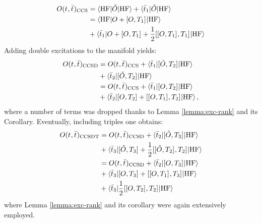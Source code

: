 \begin{equation}\label{eq:ccs-expectation-value}
\begin{aligned}
  O(t_{}, \bar{t}_{})_\mathrm{CCS} &=
  \braket{\mathrm{HF} | \check{O} | \mathrm{HF} }
  + \braket{\bar{t}_{1} | \check{O} | \mathrm{HF} } \\
  &=
  \braket{\mathrm{HF} | O + [ O, T_1 ]^{} | \mathrm{HF} } \\
  &+ \braket{\bar{t}_{1} | O + [ O, T_1 ]^{}
  + \frac{1}{2}[ [ O, T_1 ]^{}, T_1 ]^{} | \mathrm{HF} }
\end{aligned}
\end{equation}
Adding double excitations to the manifold yields:
\begin{equation}\label{eq:ccsd-expectation-value}
  \begin{aligned}
  O(t_{}, \bar{t}_{})_\mathrm{CCSD}
  &=
    O(t_{}, \bar{t}_{})_\mathrm{CCS}
  + \braket{\bar{t}_{1} | [ \check{O}, T_2 ]^{} | \mathrm{HF} } \\
  &+ \braket{\bar{t}_{2} | [ \check{O}, T_2 ]^{} | \mathrm{HF} } \\
  &=
    O(t_{}, \bar{t}_{})_\mathrm{CCS}
  + \braket{\bar{t}_{1} | [ O, T_2 ]^{} | \mathrm{HF} } \\
  &+ \braket{\bar{t}_{2} | [ O, T_2 ]^{}
      + [ [ O, T_1 ]^{}, T_2 ]^{}
  | \mathrm{HF} },
  \end{aligned}
\end{equation}
where a number of terms was dropped thanks to Lemma \ref{lemma:exc-rank} and its
Corollary.
Eventually, including triples one obtains:
\begin{equation}\label{eq:ccsdt-expectation-value}
\begin{aligned}
  O(t_{}, \bar{t}_{})_\mathrm{CCSDT}
  &=
    O(t_{}, \bar{t}_{})_\mathrm{CCSD}
  + \braket{\bar{t}_{2} | [ \check{O}, T_3 ]^{} | \mathrm{HF} } \\
  &+ \braket{\bar{t}_{3} | [ \check{O}, T_3 ]^{}
    + \frac{1}{2}[ [ \check{O}, T_2 ]^{}, T_2 ]^{}
  | \mathrm{HF} } \\
  &=
    O(t_{}, \bar{t}_{})_\mathrm{CCSD}
  + \braket{\bar{t}_{2} | [ O, T_3 ]^{} | \mathrm{HF} } \\
  &+ \braket{\bar{t}_{3} | [ O, T_3 ]^{}
    + [ [ O, T_1 ]^{}, T_3 ]^{}
  | \mathrm{HF} } \\
  &+ \braket{\bar{t}_{3} |
     \frac{1}{2}[ [ O, T_2 ]^{}, T_2 ]^{}
  | \mathrm{HF} }
\end{aligned}
\end{equation}
where Lemma \ref{lemma:exc-rank} and its corollary were again extensively employed.

